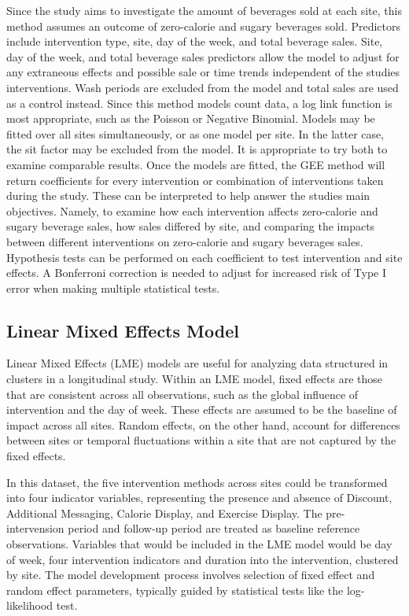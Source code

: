 \documentclass[
]{article}
\begin{document}
Since the study aims to investigate the amount of beverages sold at each site, this method assumes an outcome of zero-calorie and sugary beverages sold. Predictors include intervention type, site, day of the week, and total beverage sales. Site, day of the week, and total beverage sales predictors allow the model to adjust for any extraneous effects and possible sale or time trends independent of the studies interventions. Wash periods are excluded from the model and total sales are used as a control instead. Since this method models count data, a log link function is most appropriate, such as the Poisson or Negative Binomial. Models may be fitted over all sites simultaneously, or as one model per site. In the latter case, the sit factor may be excluded from the model. It is appropriate to try both to examine comparable results. Once the models are fitted, the GEE method will return coefficients for every intervention or combination of interventions taken during the study. These can be interpreted to help answer the studies main objectives. Namely, to examine how each intervention affects zero-calorie and sugary beverage sales, how sales differed by site, and comparing the impacts between different interventions on zero-calorie and sugary beverages sales. Hypothesis tests can be performed on each coefficient to test intervention and site effects. A Bonferroni correction is needed to adjust for increased risk of Type I error when making multiple statistical tests.

\hypertarget{linear-mixed-effects-model}{%
\subsection{Linear Mixed Effects Model}\label{linear-mixed-effects-model}}

Linear Mixed Effects (LME) models are useful for analyzing data structured in clusters in a longitudinal study. Within an LME model, fixed effects are those that are consistent across all observations, such as the global influence of intervention and the day of week. These effects are assumed to be the baseline of impact across all sites. Random effects, on the other hand, account for differences between sites or temporal fluctuations within a site that are not captured by the fixed effects.

In this dataset, the five intervention methods across sites could be transformed into four indicator variables, representing the presence and absence of Discount, Additional Messaging, Calorie Display, and Exercise Display. The pre-intervension period and follow-up period are treated as baseline reference observations. Variables that would be included in the LME model would be day of week, four intervention indicators and duration into the intervention, clustered by site. The model development process involves selection of fixed effect and random effect parameters, typically guided by statistical tests like the log-likelihood test.
\end{document}

